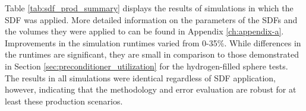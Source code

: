 
\begin{table}
  \small
    \caption{A summary of SDF application to several production DAGMC models.}
    \label{tab:sdf_prod_summary}
\end{table}

Table \ref{tab:sdf_prod_summary} displays the results of simulations in which
the SDF was applied. More detailed information on the parameters of the SDFs and
the volumes they were applied to can be found in Appendix
\ref{ch:appendix-a}. Improvements in the simulation runtimes varied from
0-35\%. While differences in the runtimes are significant, they are small in
comparison to those demonstrated in Section \ref{sec:preconditioner_utilization}
for the hydrogen-filled sphere tests. The results in all simulations were
identical regardless of SDF application, however, indicating that the
methodology and error evaluation are robust for at least these production
scenarios.

